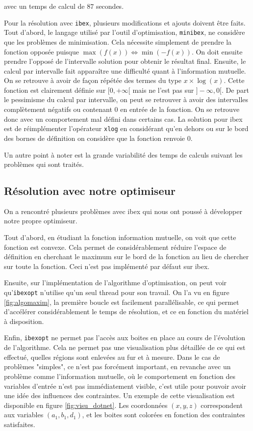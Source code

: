 avec un temps de calcul de $87$ secondes.

Pour la résolution avec \texttt{ibex}, plusieurs modifications et ajouts doivent être faits. Tout d'abord, le langage utilisé par l'outil d'optimisation, \texttt{minibex}, ne considère que les problèmes de minimisation. Cela nécessite simplement de prendre la fonction opposée puisque $\max(f(x)) \Leftrightarrow \min(-f(x))$. On doit ensuite prendre l'opposé de l'intervalle solution pour obtenir le résultat final. Ensuite, le calcul par intervalle fait apparaître une difficulté quant à l'information mutuelle. On se retrouve à avoir de façon répétée des termes du type $x\times\log(x)$. Cette fonction est clairement définie sur $[0, +\infty[$ mais ne l'est pas sur $]-\infty, 0[$. De part le pessimisme du calcul par intervalle, on peut se retrouver à avoir des intervalles complètement négatifs ou contenant $0$ en entrée de la fonction. On se retrouve donc avec un comportement mal défini dans certains cas. La solution pour ibex est de réimplémenter l'opérateur \texttt{xlog} en considérant qu'en dehors ou sur le bord des bornes de définition on considère que la fonction renvoie $0$. 

Un autre point à noter est la grande variabilité des temps de calculs suivant les problèmes qui sont traités.

\subsection{Résolution avec notre optimiseur}
On a rencontré plusieurs problèmes avec ibex qui nous ont poussé à développer notre propre optimiseur. 

Tout d'abord, en étudiant la fonction information mutuelle, on voit que cette fonction est convexe. Cela permet de considérablement réduire l'espace de définition en cherchant le maximum sur le bord de la fonction au lieu de chercher sur toute la fonction. Ceci n'est pas implémenté par défaut sur ibex.

Ensuite, sur l'implémentation de l'algorithme d'optimisation, on peut voir qu'\texttt{ibexopt} n'utilise qu'un seul thread pour son travail. On l'a vu en figure \ref{fig:algomaxim}, la première boucle est facilement parallélisable, ce qui permet d'accélérer considérablement le temps de résolution, et ce en fonction du matériel à disposition.


Enfin, \texttt{ibexopt} ne permet pas l'accès aux boites en place au cours de l'évolution de l'algorithme. Cela ne permet pas une visualisation plus détaillée de ce qui est effectué, quelles régions sont enlevées au fur et à mesure. Dans le cas de problèmes "simples", ce n'est pas forcément important, en revanche avec un problème comme l'information mutuelle, où le comportement en fonction des variables d'entrée n'est pas immédiatement visible, c'est utile pour pouvoir avoir une idée des influences des contraintes. Un exemple de cette visualisation est disponible en figure \ref{fig:visu_dotnet}. Les coordonnées $(x, y, z)$ correspondent aux variables $(a_1, b_1, d_1)$, et les boites sont colorées en fonction des contraintes satisfaites.

